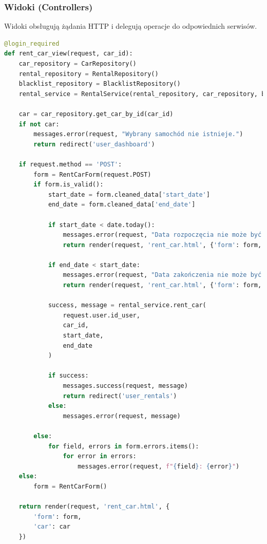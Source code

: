 \documentclass[12pt,a4paper]{article}
\begin{document}
\subsubsection{Widoki (Controllers)}

Widoki obsługują żądania HTTP i delegują operacje do odpowiednich serwisów.

\begin{lstlisting}[language=Python, caption={Fragment widoku wypożyczania samochodu}]
@login_required
def rent_car_view(request, car_id):
    car_repository = CarRepository()
    rental_repository = RentalRepository()
    blacklist_repository = BlacklistRepository()
    rental_service = RentalService(rental_repository, car_repository, blacklist_repository)
    
    car = car_repository.get_car_by_id(car_id)
    if not car:
        messages.error(request, "Wybrany samochód nie istnieje.")
        return redirect('user_dashboard')
    
    if request.method == 'POST':
        form = RentCarForm(request.POST)
        if form.is_valid():
            start_date = form.cleaned_data['start_date']
            end_date = form.cleaned_data['end_date']
            
            if start_date < date.today():
                messages.error(request, "Data rozpoczęcia nie może być w przeszłości.")
                return render(request, 'rent_car.html', {'form': form, 'car': car})
            
            if end_date < start_date:
                messages.error(request, "Data zakończenia nie może być wcześniejsza niż data rozpoczęcia.")
                return render(request, 'rent_car.html', {'form': form, 'car': car})

            success, message = rental_service.rent_car(
                request.user.id_user, 
                car_id, 
                start_date, 
                end_date
            )
            
            if success:
                messages.success(request, message)
                return redirect('user_rentals')
            else:
                messages.error(request, message)
                
        else:
            for field, errors in form.errors.items():
                for error in errors:
                    messages.error(request, f"{field}: {error}")
    else:
        form = RentCarForm()
    
    return render(request, 'rent_car.html', {
        'form': form, 
        'car': car
    })
\end{lstlisting}
\end{document}
